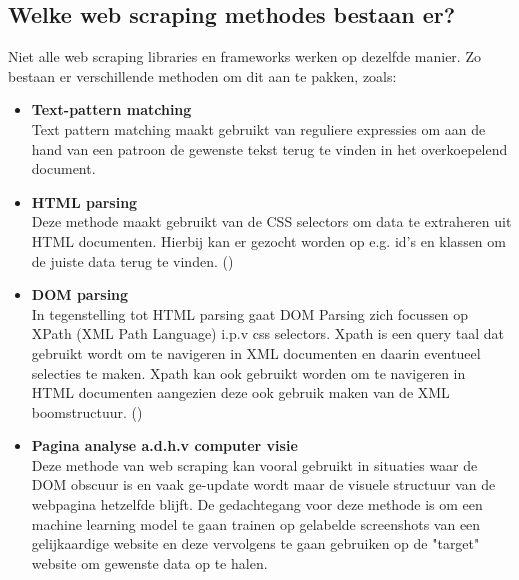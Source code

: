 \subsection{Welke web scraping methodes bestaan er?}
Niet alle web scraping libraries en frameworks werken op dezelfde manier. Zo bestaan er verschillende methoden om dit aan te pakken, zoals:
\begin{itemize}
    \item \textbf{Text-pattern matching}
    \\
    Text pattern matching maakt gebruikt van reguliere expressies om aan de hand van een patroon de gewenste tekst terug te vinden in het overkoepelend document.
    \item \textbf{HTML parsing}
    \\
    Deze methode maakt gebruikt van de CSS selectors om data te extraheren uit HTML documenten. Hierbij kan er gezocht worden op e.g. id's en klassen om de juiste data terug te vinden. (\cite{Persson2019})
    \item \textbf{DOM parsing}
    \\ In tegenstelling tot HTML parsing gaat DOM Parsing zich focussen op XPath (XML Path Language)  i.p.v css selectors. Xpath is een query taal dat gebruikt wordt om te navigeren in XML documenten en daarin eventueel selecties te maken. Xpath kan ook gebruikt worden om te navigeren in HTML documenten aangezien deze ook gebruik maken van de XML boomstructuur. (\cite{Persson2019,Mitchell2018})
    \item \textbf{Pagina analyse a.d.h.v computer visie}
    \\
    Deze methode van web scraping kan vooral gebruikt in situaties waar de DOM obscuur is en vaak ge-update wordt maar de visuele structuur van de webpagina hetzelfde blijft. De gedachtegang voor deze methode is om een machine learning model te gaan trainen op gelabelde screenshots van een gelijkaardige website en deze vervolgens te gaan gebruiken op de "target" website om gewenste data op te halen.
\end{itemize}

